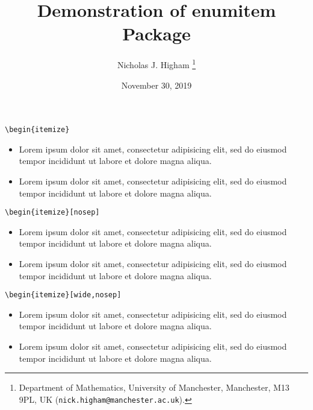 \documentclass[12pt]{article}
\title{Demonstration of enumitem Package}
\author{Nicholas J. Higham%
        \thanks{%
                Department of Mathematics,
                University of Manchester,
                Manchester, M13 9PL, UK
                (\texttt{nick.higham@manchester.ac.uk}).
               }
}
\date{November 30, 2019}
\begin{document}
\maketitle
\thispagestyle{empty}

\begin{verbatim}
\begin{itemize}
\end{verbatim}
\begin{itemize}

\item 
Lorem ipsum dolor sit amet, consectetur adipisicing elit, sed do
eiusmod tempor incididunt ut labore et dolore magna aliqua. 

\item 
Lorem ipsum dolor sit amet, consectetur adipisicing elit, sed do
eiusmod tempor incididunt ut labore et dolore magna aliqua. 

\end{itemize}

\begin{verbatim}
\begin{itemize}[nosep]
\end{verbatim}
\begin{itemize}[nosep]

\item 
Lorem ipsum dolor sit amet, consectetur adipisicing elit, sed do
eiusmod tempor incididunt ut labore et dolore magna aliqua. 

\item 
Lorem ipsum dolor sit amet, consectetur adipisicing elit, sed do
eiusmod tempor incididunt ut labore et dolore magna aliqua. 

\end{itemize}

\begin{verbatim}
\begin{itemize}[wide,nosep]
\end{verbatim}
\begin{itemize}[wide,nosep]

\item 
Lorem ipsum dolor sit amet, consectetur adipisicing elit, sed do
eiusmod tempor incididunt ut labore et dolore magna aliqua. 

\item 
Lorem ipsum dolor sit amet, consectetur adipisicing elit, sed do
eiusmod tempor incididunt ut labore et dolore magna aliqua. 

\end{itemize}
\end{document}

